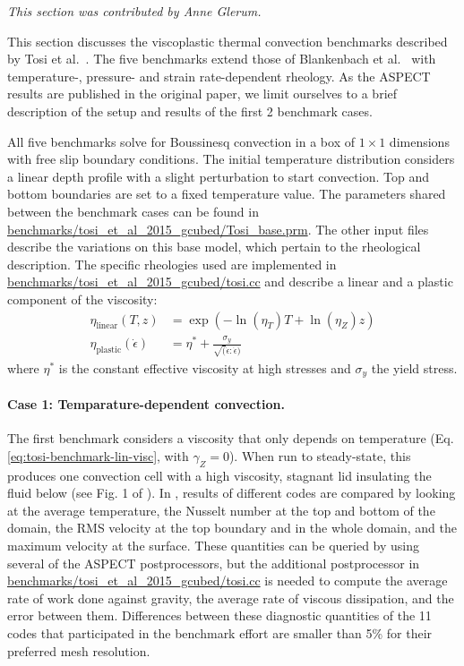 \documentclass{article}
\newcommand{\aspect}{\textsc{ASPECT}}
\begin{document}
\textit{This section was contributed by Anne Glerum.}

This section discusses the viscoplastic thermal convection benchmarks described by Tosi et al.~\cite{T15}.  The five benchmarks extend those of Blankenbach et al.~\cite{BBC89} with temperature-, pressure- and strain rate-dependent rheology. As the \aspect{} results are published in the original paper, we limit ourselves to a brief description of the setup and results of the first 2 benchmark cases. 

All five benchmarks solve for Boussinesq convection in a box of $1 \times 1$ dimensions with free slip boundary conditions. The initial temperature distribution considers a linear depth profile with a slight perturbation to start convection. Top and bottom boundaries are set to a fixed temperature value. The parameters shared between the benchmark cases can be found in \url{benchmarks/tosi_et_al_2015_gcubed/Tosi_base.prm}. The other input files describe the variations on this base model, which pertain to the rheological description. The specific rheologies used are implemented in \url{benchmarks/tosi_et_al_2015_gcubed/tosi.cc} and describe a linear and a plastic component of the viscosity:
\begin{align}
  \eta_\text{linear}(T,z) &= \exp(-\ln(\eta_T) T + \ln(\eta_Z) z)
  \label{eq:tosi-benchmark-lin-visc} \\
  \eta_\text{plastic}(\dot\epsilon) &= \eta^\ast + \frac{\sigma_y}{\sqrt(\dot\epsilon:\dot\epsilon)}
  \label{eq:tosi-benchmark-plast-visc}
\end{align}
where $\eta^\ast$ is the constant effective viscosity at high stresses and $\sigma_y$ the yield stress.

\paragraph{Case 1: Temparature-dependent convection.}
\label{sec:benchmark-tosi-case-1}

The first benchmark considers a viscosity that only depends on temperature (Eq. \eqref{eq:tosi-benchmark-lin-visc}, with $\gamma_Z=0$). When run to steady-state, this produces one convection cell with a high viscosity, stagnant lid insulating the fluid below (see Fig. 1 of \cite{T15}). In \cite{T15}, results of different codes are compared by looking at the average temperature, the Nusselt number at the top and bottom of the domain, the RMS velocity at the top boundary and in the whole domain, and the maximum velocity at the surface. These quantities can be queried by using several of the \aspect{} postprocessors, but the additional postprocessor in \url{benchmarks/tosi_et_al_2015_gcubed/tosi.cc} is needed to compute the average rate of work done against gravity, the average rate of viscous dissipation, and the error between them. Differences between these diagnostic quantities of the 11 codes that participated in the benchmark effort are smaller than 5\% for their preferred mesh resolution.
\end{document}
